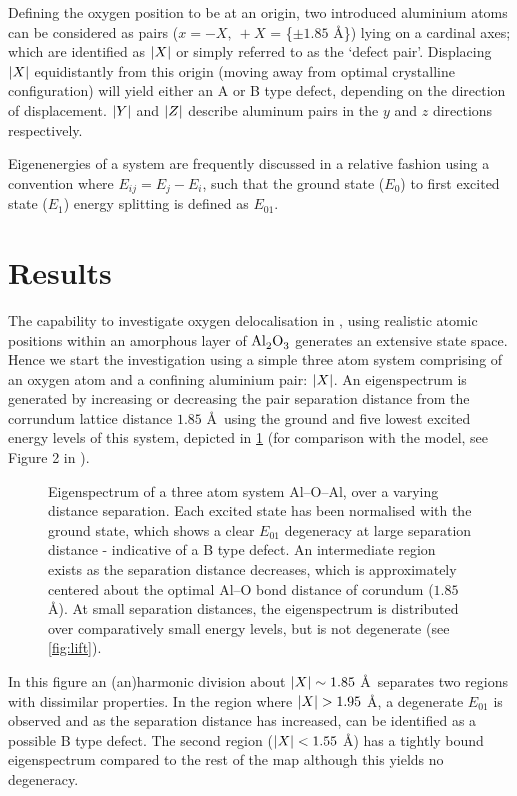 Defining the oxygen position to be at an origin, two introduced aluminium atoms can be considered as pairs ($x = -X, \: +X$ = \{$\pm 1.85$ \AA\}) lying on a cardinal axes; which are identified as $\lvert X\rvert$ or simply referred to as the `defect pair'.
Displacing $\lvert X\rvert$ equidistantly from this origin (\ie moving away from optimal crystalline configuration) will yield either an A or B type defect, depending on the direction of displacement.
$\lvert Y\rvert$ and $\lvert Z\rvert$ describe aluminum pairs in the $y$ and $z$ directions respectively.

Eigenenergies of a system are frequently discussed in a relative fashion using a convention where $E_{ij} = E_j-E_i$, such that the ground state ($E_0$) to first excited state ($E_1$) energy splitting is defined as $E_{01}$.

\section{Results}

The capability to investigate oxygen delocalisation in , using realistic atomic positions within an amorphous layer of $\ce{Al_2O_3}$ generates an extensive state space.
Hence we start the investigation using a simple three atom system comprising of an oxygen atom and a confining aluminium pair: $\lvert X\rvert$.
An eigenspectrum is generated by increasing or decreasing the pair separation distance from the corrundum lattice distance $1.85$ \AA\ using the ground and five lowest excited energy levels of this system, depicted in \cref{fig:spect3d} (for comparison with the  model, see Figure 2 in ).

\begin{figure}[htp]
  \resizebox{0.9\textwidth}{!}{}
  \caption{\label{fig:spect3d}Eigenspectrum of a three atom system Al--O--Al, over a varying distance separation. Each excited state has been normalised with the ground state, which shows a clear $E_{01}$ degeneracy at large separation distance - indicative of a B type defect. An intermediate region exists as the separation distance decreases, which is approximately centered about the optimal Al--O bond distance of corundum ($1.85$ \AA). At small separation distances, the eigenspectrum is distributed over comparatively small energy levels, but is not degenerate (see \cref{fig:lift}).}
\end{figure}

In this figure an (an)harmonic division about $\lvert X\rvert \sim 1.85$ \AA\ separates two regions with dissimilar properties.
In the region where $\lvert X\rvert > 1.95$ \AA, a degenerate $E_{01}$ is observed and as the separation distance has increased, can be identified as a possible B type defect.
The second region ($\lvert X\rvert < 1.55$ \AA) has a tightly bound eigenspectrum compared to the rest of the map although this yields no degeneracy.

